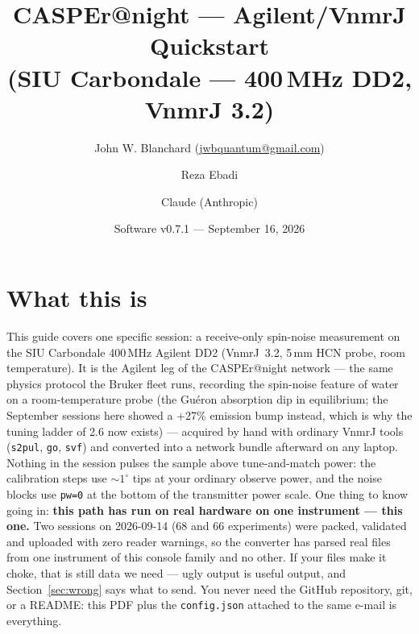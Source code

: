 \documentclass[11pt]{article}
\title{\textbf{CASPEr@night --- Agilent/VnmrJ Quickstart}\\
\large (SIU Carbondale --- 400\,MHz DD2, VnmrJ 3.2)}
\author{John W. Blanchard (\href{mailto:jwbquantum@gmail.com}{jwbquantum@gmail.com})
\and Reza Ebadi \and Claude (Anthropic)}
\date{Software v0.7.1 --- September 16, 2026}
\newcommand{\file}[1]{\texttt{#1}}
\begin{document}
\maketitle

\section{What this is}

This guide covers one specific session: a receive-only spin-noise
measurement on the SIU Carbondale 400\,MHz Agilent DD2 (VnmrJ~3.2, 5\,mm
HCN probe, room temperature). It is the Agilent leg of the CASPEr@night
network --- the same physics protocol the Bruker fleet runs, recording
the spin-noise feature of water on a room-temperature probe (the
Gu\'eron absorption dip in equilibrium; the September sessions here
showed a +27\% emission bump instead, which is why the tuning ladder of
2.6 now exists) ---
acquired by hand with ordinary VnmrJ tools (\texttt{s2pul},
\texttt{go}, \texttt{svf}) and converted into a network bundle
afterward on any laptop. Nothing in the session pulses the sample above
tune-and-match power: the calibration steps use ${\sim}1^{\circ}$ tips
at your ordinary observe power, and the noise blocks use
\texttt{pw=0} at the bottom of the transmitter power scale. One thing
to know going in: \textbf{this path has run on real hardware on one
instrument --- this one.} Two sessions on 2026-09-14 (68 and 66
experiments) were packed, validated and uploaded with zero reader
warnings, so the converter has parsed real files from one instrument of
this console family and no other. If your files make it choke, that is still data we need ---
ugly output is useful output, and Section~\ref{sec:wrong} says what to
send. You never need the GitHub repository, git, or a README: this PDF
plus the \file{config.json} attached to the same e-mail is everything.
\end{document}
